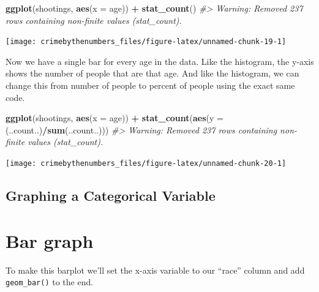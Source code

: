 \documentclass[
  12pt,
]{book}
\newenvironment{Shaded}{\begin{snugshade}}{\end{snugshade}}
\newcommand{\CommentTok}[1]{\textcolor[rgb]{0.37,0.37,0.37}{\textit{#1}}}
\newcommand{\DataTypeTok}[1]{\textcolor[rgb]{0.27,0.27,0.27}{#1}}
\newcommand{\KeywordTok}[1]{\textcolor[rgb]{0.27,0.27,0.27}{\textbf{#1}}}
\newcommand{\NormalTok}[1]{#1}
\newcommand{\OperatorTok}[1]{\textcolor[rgb]{0.43,0.43,0.43}{\textbf{#1}}}
\newcommand{\StringTok}[1]{\textcolor[rgb]{0.5,0.5,0.5}{#1}}
\begin{document}
\begin{Shaded}
\begin{Highlighting}[]
\KeywordTok{ggplot}\NormalTok{(shootings, }\KeywordTok{aes}\NormalTok{(}\DataTypeTok{x =}\NormalTok{ age)) }\OperatorTok{+}\StringTok{ }
\StringTok{  }\KeywordTok{stat\_count}\NormalTok{()}
\CommentTok{\#> Warning: Removed 237 rows containing non{-}finite values (stat\_count).}
\end{Highlighting}
\end{Shaded}

\begin{center}\texttt{[image: crimebythenumbers\_files/figure-latex/unnamed-chunk-19-1]} \end{center}

Now we have a single bar for every age in the data. Like the histogram, the y-axis shows the number of people that are that age. And like the histogram, we can change this from number of people to percent of people using the exact same code.

\begin{Shaded}
\begin{Highlighting}[]
\KeywordTok{ggplot}\NormalTok{(shootings, }\KeywordTok{aes}\NormalTok{(}\DataTypeTok{x =}\NormalTok{ age)) }\OperatorTok{+}\StringTok{ }
\StringTok{  }\KeywordTok{stat\_count}\NormalTok{(}\KeywordTok{aes}\NormalTok{(}\DataTypeTok{y =}\NormalTok{ (..count..)}\OperatorTok{/}\KeywordTok{sum}\NormalTok{(..count..)))}
\CommentTok{\#> Warning: Removed 237 rows containing non{-}finite values (stat\_count).}
\end{Highlighting}
\end{Shaded}

\begin{center}\texttt{[image: crimebythenumbers\_files/figure-latex/unnamed-chunk-20-1]} \end{center}

\hypertarget{graphing-a-categorical-variable}{%
\subsection{Graphing a Categorical Variable}\label{graphing-a-categorical-variable}}

\hypertarget{bar-graph}{%
\section{Bar graph}\label{bar-graph}}

To make this barplot we'll set the x-axis variable to our ``race'' column and add \texttt{geom\_bar()} to the end.
\end{document}
